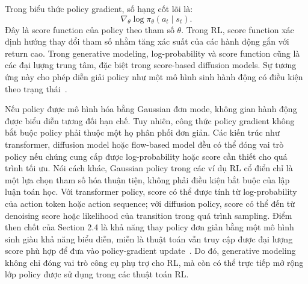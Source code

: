 Trong biểu thức policy gradient, số hạng cốt lõi là:
\begin{equation}
    \nabla_\theta \log \pi_\theta(a_t\mid s_t).
\end{equation}
Đây là score function của policy theo tham số $\theta$.
Trong RL, score function xác định hướng thay đổi tham số nhằm tăng xác suất của các hành động gắn với return cao.
Trong generative modeling, log-probability và score function cũng là các đại lượng trung tâm, đặc biệt trong score-based diffusion models.
Sự tương ứng này cho phép diễn giải policy như một mô hình sinh hành động có điều kiện theo trạng thái~\citep{eysenbach2025generativerl}.

Nếu policy được mô hình hóa bằng Gaussian đơn mode, không gian hành động được biểu diễn tương đối hạn chế.
Tuy nhiên, công thức policy gradient không bắt buộc policy phải thuộc một họ phân phối đơn giản.
Các kiến trúc như transformer, diffusion model hoặc flow-based model đều có thể đóng vai trò policy nếu chúng cung cấp được log-probability hoặc score cần thiết cho quá trình tối ưu.
Nói cách khác, Gaussian policy trong các ví dụ RL cổ điển chỉ là một lựa chọn tham số hóa thuận tiện, không phải điều kiện bắt buộc của lập luận toán học.
Với transformer policy, score có thể được tính từ log-probability của action token hoặc action sequence; với diffusion policy, score có thể đến từ denoising score hoặc likelihood của transition trong quá trình sampling.
Điểm then chốt của Section 2.4 là khả năng thay policy đơn giản bằng một mô hình sinh giàu khả năng biểu diễn, miễn là thuật toán vẫn truy cập được đại lượng score phù hợp để đưa vào policy-gradient update~\citep{eysenbach2025generativerl}.
Do đó, generative modeling không chỉ đóng vai trò công cụ phụ trợ cho RL, mà còn có thể trực tiếp mở rộng lớp policy được sử dụng trong các thuật toán RL.

